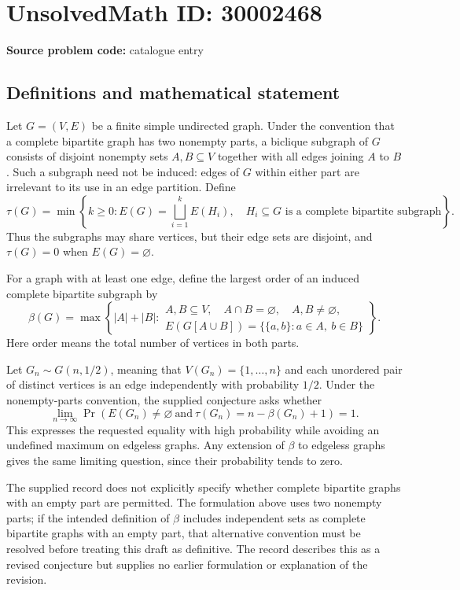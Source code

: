 \documentclass[11pt]{article}
\begin{document}
\section*{UnsolvedMath ID: 30002468}
\textbf{Source problem code:} catalogue entry
\subsection{Definitions and mathematical statement}
Let \(G=(V,E)\) be a finite simple undirected graph. Under the convention that a complete bipartite graph has two nonempty parts, a biclique subgraph of \(G\) consists of disjoint nonempty sets \(A,B\subseteq V\) together with all edges joining \(A\) to \(B\). Such a subgraph need not be induced: edges of \(G\) within either part are irrelevant to its use in an edge partition. Define
\[
\tau(G)=\min\left\{k\geq 0:E(G)=\bigsqcup_{i=1}^{k}E(H_i),\quad H_i\subseteq G\text{ is a complete bipartite subgraph}\right\}.
\]
Thus the subgraphs may share vertices, but their edge sets are disjoint, and \(\tau(G)=0\) when \(E(G)=\varnothing\).

For a graph with at least one edge, define the largest order of an induced complete bipartite subgraph by
\[
\beta(G)=\max\left\{|A|+|B|:\begin{array}{l}
A,B\subseteq V,\quad A\cap B=\varnothing,\quad A,B\ne\varnothing,\\
E(G[A\cup B])=\{\{a,b\}:a\in A,\ b\in B\}
\end{array}\right\}.
\]
Here order means the total number of vertices in both parts.

Let \(G_n\sim G(n,1/2)\), meaning that \(V(G_n)=\{1,\ldots,n\}\) and each unordered pair of distinct vertices is an edge independently with probability \(1/2\). Under the nonempty-parts convention, the supplied conjecture asks whether
\[
\lim_{n\to\infty}\Pr\!\left(E(G_n)\ne\varnothing\ \text{and}\ \tau(G_n)=n-\beta(G_n)+1\right)=1.
\]
This expresses the requested equality with high probability while avoiding an undefined maximum on edgeless graphs. Any extension of \(\beta\) to edgeless graphs gives the same limiting question, since their probability tends to zero.

The supplied record does not explicitly specify whether complete bipartite graphs with an empty part are permitted. The formulation above uses two nonempty parts; if the intended definition of \(\beta\) includes independent sets as complete bipartite graphs with an empty part, that alternative convention must be resolved before treating this draft as definitive. The record describes this as a revised conjecture but supplies no earlier formulation or explanation of the revision.
\end{document}
